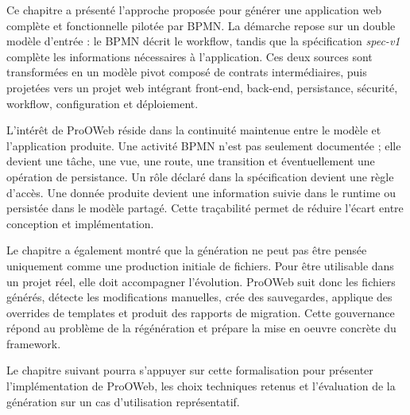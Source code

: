 Ce chapitre a présenté l'approche proposée pour générer une application web complète et fonctionnelle pilotée par BPMN. La démarche repose sur un double modèle d'entrée : le BPMN décrit le workflow, tandis que la spécification \textit{spec-v1} complète les informations nécessaires à l'application. Ces deux sources sont transformées en un modèle pivot composé de contrats intermédiaires, puis projetées vers un projet web intégrant front-end, back-end, persistance, sécurité, workflow, configuration et déploiement.

L'intérêt de ProOWeb réside dans la continuité maintenue entre le modèle et l'application produite. Une activité BPMN n'est pas seulement documentée ; elle devient une tâche, une vue, une route, une transition et éventuellement une opération de persistance. Un rôle déclaré dans la spécification devient une règle d'accès. Une donnée produite devient une information suivie dans le runtime ou persistée dans le modèle partagé. Cette traçabilité permet de réduire l'écart entre conception et implémentation.

Le chapitre a également montré que la génération ne peut pas être pensée uniquement comme une production initiale de fichiers. Pour être utilisable dans un projet réel, elle doit accompagner l'évolution. ProOWeb suit donc les fichiers générés, détecte les modifications manuelles, crée des sauvegardes, applique des overrides de templates et produit des rapports de migration. Cette gouvernance répond au problème de la régénération et prépare la mise en oeuvre concrète du framework.

Le chapitre suivant pourra s'appuyer sur cette formalisation pour présenter l'implémentation de ProOWeb, les choix techniques retenus et l'évaluation de la génération sur un cas d'utilisation représentatif.
